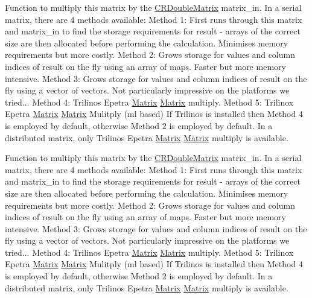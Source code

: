 Function to multiply this matrix by the \hyperlink{classoomph_1_1CRDoubleMatrix}{C\+R\+Double\+Matrix} matrix\+\_\+in. In a serial matrix, there are 4 methods available\+: Method 1\+: First runs through this matrix and matrix\+\_\+in to find the storage requirements for result -\/ arrays of the correct size are then allocated before performing the calculation. Minimises memory requirements but more costly. Method 2\+: Grows storage for values and column indices of result \textquotesingle{}on the fly\textquotesingle{} using an array of maps. Faster but more memory intensive. Method 3\+: Grows storage for values and column indices of result \textquotesingle{}on the fly\textquotesingle{} using a vector of vectors. Not particularly impressive on the platforms we tried... Method 4\+: Trilinos Epetra \hyperlink{classoomph_1_1Matrix}{Matrix} \hyperlink{classoomph_1_1Matrix}{Matrix} multiply. Method 5\+: Trilinox Epetra \hyperlink{classoomph_1_1Matrix}{Matrix} \hyperlink{classoomph_1_1Matrix}{Matrix} Mulitply (ml based) If Trilinos is installed then Method 4 is employed by default, otherwise Method 2 is employed by default. In a distributed matrix, only Trilinos Epetra \hyperlink{classoomph_1_1Matrix}{Matrix} \hyperlink{classoomph_1_1Matrix}{Matrix} multiply is available. 

Function to multiply this matrix by the \hyperlink{classoomph_1_1CRDoubleMatrix}{C\+R\+Double\+Matrix} matrix\+\_\+in. In a serial matrix, there are 4 methods available\+: Method 1\+: First runs through this matrix and matrix\+\_\+in to find the storage requirements for result -\/ arrays of the correct size are then allocated before performing the calculation. Minimises memory requirements but more costly. Method 2\+: Grows storage for values and column indices of result \textquotesingle{}on the fly\textquotesingle{} using an array of maps. Faster but more memory intensive. Method 3\+: Grows storage for values and column indices of result \textquotesingle{}on the fly\textquotesingle{} using a vector of vectors. Not particularly impressive on the platforms we tried... Method 4\+: Trilinos Epetra \hyperlink{classoomph_1_1Matrix}{Matrix} \hyperlink{classoomph_1_1Matrix}{Matrix} multiply. Method 5\+: Trilinox Epetra \hyperlink{classoomph_1_1Matrix}{Matrix} \hyperlink{classoomph_1_1Matrix}{Matrix} Mulitply (ml based) If Trilinos is installed then Method 4 is employed by default, otherwise Method 2 is employed by default. In a distributed matrix, only Trilinos Epetra \hyperlink{classoomph_1_1Matrix}{Matrix} \hyperlink{classoomph_1_1Matrix}{Matrix} multiply is available. 

